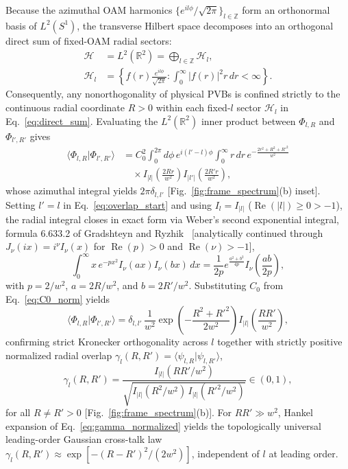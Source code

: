 \documentclass[aps,pra,reprint,amsmath,amssymb,floatfix,longbibliography]{revtex4-2}
\providecommand{\braket}[2]{\langle#1\vert#2\rangle}
\providecommand{\abs}[1]{\lvert#1\rvert}
\begin{document}
Because the azimuthal OAM harmonics $\{e^{il\phi}/\sqrt{2\pi}\}_{l\in\mathbb{Z}}$ form an orthonormal basis of $L^2(S^1)$, the transverse Hilbert space decomposes into an orthogonal direct sum of fixed-OAM radial sectors:
\begin{align}
\mathcal{H} &= L^2(\mathbb{R}^2) = \bigoplus_{l\in\mathbb{Z}} \mathcal{H}_l, \nonumber \\
\mathcal{H}_l &= \left\{ f(r)\frac{e^{il\phi}}{\sqrt{2\pi}} : \int_0^\infty \abs{f(r)}^2 r\,dr < \infty \right\}.
\label{eq:direct_sum}
\end{align}
Consequently, any nonorthogonality of physical PVBs is confined strictly to the continuous radial coordinate $R > 0$ within each fixed-$l$ sector $\mathcal{H}_l$ in Eq.~\eqref{eq:direct_sum}. Evaluating the $L^2(\mathbb{R}^2)$ inner product between $\Phi_{l,R}$ and $\Phi_{l',R'}$ gives
\begin{align}
\braket{\Phi_{l,R}}{\Phi_{l',R'}} &= C_0^2 \int_0^{2\pi} d\phi\, e^{i(l'-l)\phi} \int_0^\infty r\,dr\, e^{-\frac{2r^2+R^2+R'^2}{w^2}} \nonumber \\
&\quad \times I_{\abs{l}}\!\left(\frac{2Rr}{w^2}\right) I_{\abs{l'}}\!\left(\frac{2R'r}{w^2}\right),
\label{eq:overlap_start}
\end{align}
whose azimuthal integral yields $2\pi\delta_{l,l'}$ [Fig.~\ref{fig:frame_spectrum}(b) inset]. Setting $l' = l$ in Eq.~\eqref{eq:overlap_start} and using $I_l = I_{\abs{l}}$ ($\operatorname{Re}(\abs{l}) \ge 0 > -1$), the radial integral closes in exact form via Weber's second exponential integral, formula 6.633.2 of Gradshteyn and Ryzhik~\cite{Gradshteyn2014} [analytically continued through $J_\nu(ix) = i^\nu I_\nu(x)$ for $\operatorname{Re}(p) > 0$ and $\operatorname{Re}(\nu) > -1$],
\begin{equation}
\int_0^\infty x\, e^{-px^2} I_\nu(ax) I_\nu(bx)\,dx = \frac{1}{2p} e^{\frac{a^2+b^2}{4p}} I_\nu\!\left(\frac{ab}{2p}\right),
\label{eq:weber_identity}
\end{equation}
with $p = 2/w^2$, $a = 2R/w^2$, and $b = 2R'/w^2$. Substituting $C_0$ from Eq.~\eqref{eq:C0_norm} yields
\begin{equation}
\braket{\Phi_{l,R}}{\Phi_{l',R'}} = \delta_{l,l'}\,\frac{1}{w^2}\exp\!\left(-\frac{R^2 + R'^2}{2w^2}\right) I_{\abs{l}}\!\left(\frac{RR'}{w^2}\right),
\label{eq:overlap_closed}
\end{equation}
confirming strict Kronecker orthogonality across $l$ together with strictly positive normalized radial overlap $\gamma_l(R,R') = \braket{\psi_{l,R}}{\psi_{l,R'}}$,
\begin{equation}
\gamma_l(R,R') = \frac{I_{\abs{l}}(RR'/w^2)}{\sqrt{I_{\abs{l}}(R^2/w^2)\,I_{\abs{l}}(R'^2/w^2)}} \in (0,1),
\label{eq:gamma_normalized}
\end{equation}
for all $R \neq R' > 0$ [Fig.~\ref{fig:frame_spectrum}(b)]. For $RR' \gg w^2$, Hankel expansion of Eq.~\eqref{eq:gamma_normalized} yields the topologically universal leading-order Gaussian cross-talk law $\gamma_l(R,R') \approx \exp[-(R-R')^2/(2w^2)]$, independent of $l$ at leading order.
\end{document}
